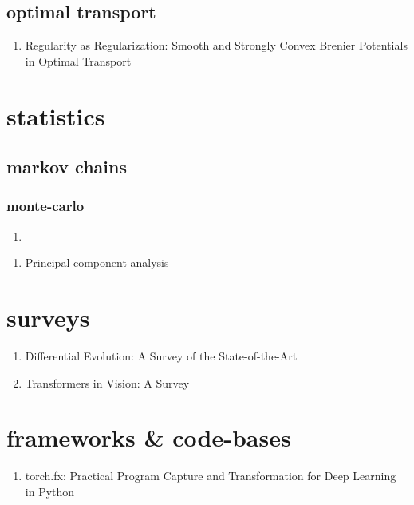 \documentclass[acmlarge]{acmart}
\begin{document}
	\subsection{optimal transport}
	\begin{enumerate}
		\item Regularity as Regularization: Smooth and Strongly Convex Brenier Potentials in Optimal Transport \cite{Paty2020RegularityAR} 

	\end{enumerate}
\begin{enumerate}
\end{enumerate}
\section{statistics}
	\subsection{markov chains}
		\subsubsection{monte-carlo}
		\begin{enumerate}
			\item
		\end{enumerate}
	\begin{enumerate}
	\end{enumerate}
\begin{enumerate}
	\item Principal component analysis \cite{Wold1987PrincipalCA} 

\end{enumerate}
\section{surveys}
\begin{enumerate}
	\item Differential Evolution: A Survey of the State-of-the-Art \cite{Das2011DifferentialEA} 

	\item Transformers in Vision: A Survey \cite{Khan2022TransformersIV} 

\end{enumerate}
\section{frameworks & code-bases}
\begin{enumerate}
	\item torch.fx: Practical Program Capture and Transformation for Deep Learning in Python \cite{Reed2021torchfxPP} 

\end{enumerate}
\end{document}
